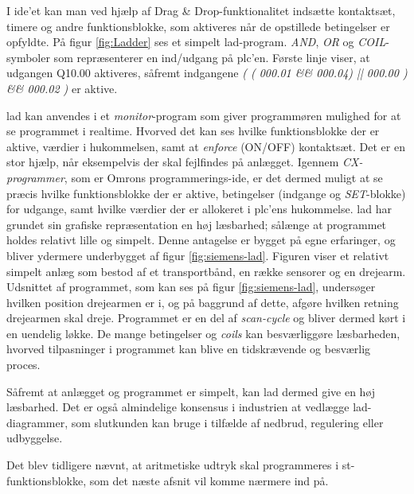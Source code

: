 I \gls{ide}'et kan man ved hjælp af Drag \& Drop-funktionalitet indsætte kontaktsæt, timere og andre funktionsblokke, som aktiveres når de opstillede betingelser er opfyldte. På figur \ref{fig:Ladder} ses et simpelt \gls{lad}-program. \textit{AND}, \textit{OR} og \textit{COIL}-symboler som repræsenterer en ind/udgang på \gls{plc}'en. Første linje viser, at udgangen Q10.00 aktiveres, såfremt indgangene \textit{( ( 000.01 \&\& 000.04) || 000.00 ) \&\& 000.02 )} er aktive.


\noindent \gls{lad} kan anvendes i et \textit{monitor}-program som giver programmøren mulighed for at se programmet i realtime. Hvorved det kan ses hvilke funktionsblokke der er aktive, værdier i hukommelsen, samt at \textit{enforce} (ON/OFF) kontaktsæt. Det er en stor hjælp, når eksempelvis der skal fejlfindes på anlægget. Igennem \textit{CX-programmer}, som er Omrons programmerings-\gls{ide}, er det dermed muligt at se præcis hvilke funktionsblokke der er aktive, betingelser (indgange og \textit{SET}-blokke) for udgange, samt hvilke værdier der er allokeret i \gls{plc}'ens hukommelse. \gls{lad} har grundet sin grafiske repræsentation en høj læsbarhed; sålænge at programmet holdes relativt lille og simpelt. Denne antagelse er bygget på egne erfaringer, og bliver ydermere underbygget af figur \ref{fig:siemens-lad}. Figuren viser et relativt simpelt anlæg som bestod af et transportbånd, en række sensorer og en drejearm. Udsnittet af programmet, som kan ses på figur \ref{fig:siemens-lad}, undersøger hvilken position drejearmen er i, og på baggrund af dette, afgøre hvilken retning drejearmen skal dreje. Programmet er en del af \textit{scan-cycle} og bliver dermed kørt i en uendelig løkke. De mange betingelser og \textit{coils} kan besværliggøre læsbarheden, hvorved tilpasninger i programmet kan blive en tidskrævende og besværlig proces.


\noindent Såfremt at anlægget og programmet er simpelt, kan \gls{lad} dermed give en høj læsbarhed. Det er også almindelige konsensus i industrien at vedlægge \gls{lad}-diagrammer, som slutkunden kan bruge i tilfælde af nedbrud, regulering eller udbyggelse. \cite{FDB_desc}

Det blev tidligere nævnt, at aritmetiske udtryk skal programmeres i \gls{st}-funktionsblokke, som det næste afsnit vil komme nærmere ind på. 


